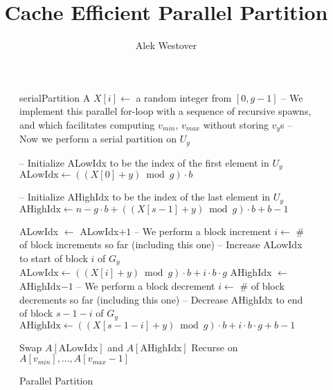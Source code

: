 \documentclass[11pt]{article}
\author{Alek Westover}
\title{Cache Efficient Parallel Partition}
\begin{document}
\begin{figure*}
	\caption{Parallel Partition}
	\label{alg:parallelPartition}
	\begin{algorithmic}
			\State serialPartition A
		\Else
				\State $X[i] \gets$ a random integer from $[0,g-1]$ 
			\EndFor
			\State -- We implement this parallel for-loop with a sequence of recursive spawns, and which facilitates computing $v_{min}$, $v_{max}$ without storing $v_y$s
				\State -- Now we perform a serial partition on $U_y$

				\State -- Initialize ALowIdx to be the index of the first element in $U_y$
				\State $\text{ALowIdx} \gets ((X[0]+y) \bmod g)\cdot b$

				\State -- Initialize AHighIdx to be the index of the last element in $U_y$
				\State $\text{AHighIdx} \gets n - g\cdot b + ((X[s-1]+y) \bmod g)\cdot b + b-1$

						\State ALowIdx $\gets$ ALowIdx$+1$
							\State -- We perform a block increment
							\State $i \gets $ \# of block increments so far (including this one)
							\State -- Increase ALowIdx to start of block $i$ of $G_y$
							\State $\text{ALowIdx} \gets ((X[i] + y)\bmod g) \cdot b + i\cdot b\cdot g$
						\EndIf
					\EndWhile
						\State AHighIdx $\gets$ AHighIdx$-1$
							\State -- We perform a block decrement
							\State $i \gets $ \# of block decrements so far (including this one)
							\State -- Decrease AHighIdx to end of block $s-1-i$ of $G_y$
							\State $\text{AHighIdx} \gets ((X[s-1-i] + y)\bmod g) \cdot b + i\cdot b\cdot g + b - 1$
						\EndIf
					\EndWhile

					\State Swap $A[\text{ALowIdx}]$ and $A[\text{AHighIdx}]$
				\EndWhile
			\EndFor
			\State Recurse on $A[v_{min}],\ldots,A[v_{max}-1]$
		\EndIf
	\end{algorithmic}	
\end{figure*}
\end{document}
